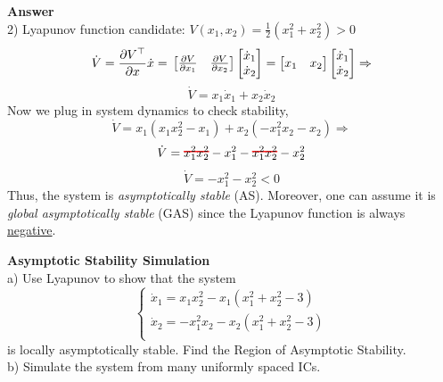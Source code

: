 \documentclass{homeworg}
\newcommand\hcancel[2][black]{\setbox0=\hbox{$#2$}%
\rlap{\raisebox{.45\ht0}{\textcolor{#1}{\rule{\wd0}{1pt}}}}#2}
\begin{document}
\noindent
\textbf{Answer} \\
2) Lyapunov function candidate: \( V(x_1, x_2) = \frac{1}{2} (x_1^2 + x_2^2) > 0\)
\begin{equation*}
\dot{V} = \frac{\partial V^\top}{\partial x} \dot{x} =\\
\begin{bmatrix}
\frac{\partial V}{\partial x_1} & \frac{\partial V}{\partial x_2}
\end{bmatrix}
\begin{bmatrix}
\dot{x}_1 \\
\dot{x}_2
\end{bmatrix}
=
\begin{bmatrix}
  x_1 & x_2
  \end{bmatrix}
  \begin{bmatrix}
  \dot{x}_1 \\
  \dot{x}_2
  \end{bmatrix}
  \Rightarrow
\end{equation*}
\begin{equation*}
\dot{V} =
  x_1 \dot{x}_1 + x_2 \dot{x}_2
\end{equation*}
Now we plug in system dynamics to check stability,
\begin{equation*}
  \dot{V} = x_1 (x_1 x_2^2 - x_1) + x_2(-x_1^2 x_2 - x_2) \Rightarrow
\end{equation*}
\begin{equation*}
  \dot{V} = \hcancel[red]{x_1^2 x_2^2} - x_1^2 - \hcancel[red]{x_1^2 x_2^2} - x_2^2
\end{equation*}
\begin{equation*}
  \dot{V} = - x_1^2 - x_2^2 < 0
\end{equation*}
Thus, the system is \emph{asymptotically stable} (AS). Moreover, one can assume
it is \emph{global asymptotically stable} (GAS) since the Lyapunov function is
always \underline{negative}.


\exercise
\noindent
\textbf{Asymptotic Stability Simulation}\\
a) Use Lyapunov to show that the system
\begin{equation*}
  \begin{cases}
    \dot{x}_1 = x_1 x_2^2 - x_1 (x_1^2 + x_2^2 -3)\\
    \dot{x}_2 = -x_1^2 x_2 - x_2(x_1^2 + x_2^2 -3)\\
  \end{cases}
\end{equation*}
is locally asymptotically stable. Find the Region of Asymptotic Stability.\\
b) Simulate the system from many uniformly spaced ICs.
\end{document}
